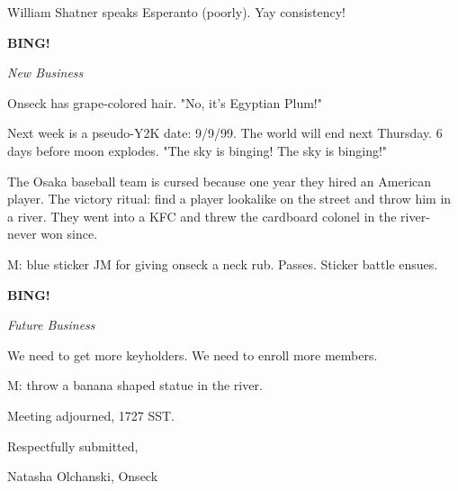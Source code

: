 \documentclass[12pt]{article}
\newcommand{\bing}{{\bf BING!} }
\newcommand{\goto}[1]{\bing \vskip 12pt \centerline{{\em{#1}}}}
\begin{document}
William Shatner speaks Esperanto (poorly). Yay consistency!

\goto{New Business}

Onseck has grape-colored hair. "No, it's Egyptian Plum!"

Next week is a pseudo-Y2K date: 9/9/99. The world will end next Thursday. 6 days before moon explodes. "The sky is binging! The sky is binging!"

The Osaka baseball team is cursed because one year they hired an American player. The victory ritual: find a player lookalike on the street and throw him in a river. They went into a KFC and threw the cardboard colonel in the river- never won since.

M: blue sticker JM for giving onseck a neck rub. Passes. Sticker battle ensues.

\goto{Future Business}

We need to get more keyholders. We need to enroll more members.

M: throw a banana shaped statue in the river.

\vspace{12pt}

\noindent
Meeting adjourned, 1727 SST.

\vspace{18pt}

\centerline{Respectfully submitted,}
\centerline{Natasha Olchanski, Onseck}
\end{document}
